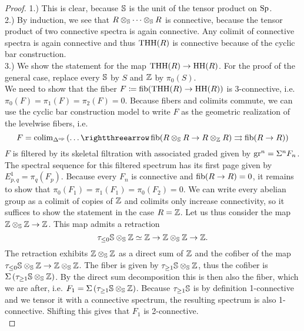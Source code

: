 \begin{proof}
    1.) This is clear, because $\S$ is the unit of the tensor product on $\Sp$. \\
    2.) By induction, we see that $R\otimes_\S\dots\otimes_\S R$ is connective, because the tensor product of two connective spectra is again connective. Any colimit of connective spectra is again connective and thus $\THH(R)$ is connective because of the cyclic bar construction. \\
    3.) We show the statement for the map $\THH(R)\to \HH(R)$. For the proof of the general case, replace every $\S$ by $S$ and $\Z$ by $\pi_0(S)$. \\
    We need to show that the fiber $F\coloneqq \fib(\THH(R)\to \HH(R))$ is 3-connective, i.e. $\pi_0(F)=\pi_1(F)=\pi_2(F)=0$. Because fibers and colimits commute, we can use the cyclic bar construction model to write $F$ as the geometric realization of the levelwise fibers, i.e.
    \begin{equation*}
        F=\colim_{\Delta^{\op}} \left( \dots\rightthreearrow \fib(R\otimes_\S R\to R\otimes_\Z R) \rightrightarrows \fib(R\to R) \right)
    \end{equation*}
    $F$ is filtered by its skeletal filtration with associated graded given by $\gr^n=\Sigma^n F_n$. The spectral sequence for this filtered spectrum has its first page given by $E^1_{p,q}=\pi_q(F_p)$. Because every $F_n$ is connective and $\fib(R\to R)=0$, it remains to show that $\pi_0(F_1)=\pi_1(F_1)=\pi_0(F_2)=0$. We can write every abelian group as a colimit of copies of $\Z$ and colimits only increase connectivity, so it suffices to show the statement in the case $R=\Z$. Let us thus consider the map $\Z\otimes_\S \Z\to \Z$. This map admits a retraction 
    \begin{equation*}
        \tau_{\leq 0}\S\otimes_\S\Z\simeq \Z\to \Z\otimes_\S \Z\to \Z.
    \end{equation*}
    The retraction exhibits $\Z\otimes_\S\Z$ as a direct sum of $\Z$ and the cofiber of the map $\tau_{\leq 0}\S\otimes_\S\Z\to \Z\otimes_\S\Z$. The fiber is given by $\tau_{\geq 1}\S\otimes_\S\Z$, thus the cofiber is $\Sigma\left( \tau_{\geq 1}\S\otimes_\S\Z \right)$. By the direct sum decomposition this is then also the fiber, which we are after, i.e. $F_1=\Sigma\left( \tau_{\geq 1}\S\otimes_\S\Z \right)$. Because $\tau_{\geq 1}\S$ is by definition 1-connective and we tensor it with a connective spectrum, the resulting spectrum is also 1-connective. Shifting this gives that $F_1$ is 2-connective. \\

\end{proof}

